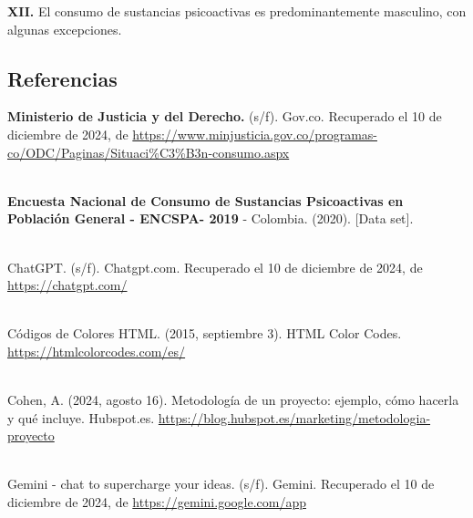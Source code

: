 \documentclass[
]{article}
\begin{document}
\textbf{XII.} El consumo de sustancias psicoactivas es predominantemente
masculino, con algunas excepciones.\\

\hfill\break

\subsection{Referencias}\label{referencias}

\textbf{Ministerio de Justicia y del Derecho.} (s/f). Gov.co. Recuperado
el 10 de diciembre de 2024, de
\url{https://www.minjusticia.gov.co/programas-co/ODC/Paginas/Situaci\%C3\%B3n-consumo.aspx}\\
\strut \\

\textbf{Encuesta Nacional de Consumo de Sustancias Psicoactivas en
Población General - ENCSPA- 2019} - Colombia. (2020). {[}Data set{]}.\\
\strut \\

ChatGPT. (s/f). Chatgpt.com. Recuperado el 10 de diciembre de 2024, de
\url{https://chatgpt.com/}\\
\strut \\

Códigos de Colores HTML. (2015, septiembre 3). HTML Color Codes.
\url{https://htmlcolorcodes.com/es/}\\
\strut \\
Cohen, A. (2024, agosto 16). Metodología de un proyecto: ejemplo, cómo
hacerla y qué incluye. Hubspot.es.
\url{https://blog.hubspot.es/marketing/metodologia-proyecto}\\
\strut \\
Gemini - chat to supercharge your ideas. (s/f). Gemini. Recuperado el 10
de diciembre de 2024, de \url{https://gemini.google.com/app}\\
\strut \\
\end{document}
